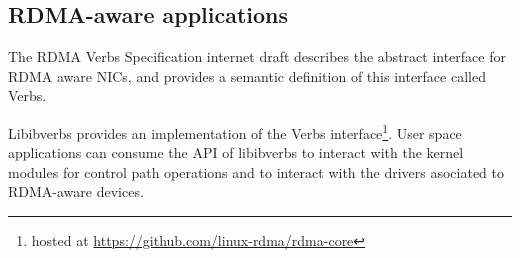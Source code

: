 






\subsection{RDMA-aware applications}

The RDMA Verbs Specification internet draft describes the abstract
interface for RDMA aware NICs, and provides a semantic definition of this
interface called Verbs\cite{hillandRDMAProtocolVerbs}.

Libibverbs provides an implementation of the Verbs interface\footnote{hosted at \url{https://github.com/linux-rdma/rdma-core}}. User space
applications can consume the API of libibverbs to interact with
the kernel modules for control path operations and to interact with the drivers asociated
to RDMA-aware devices.

